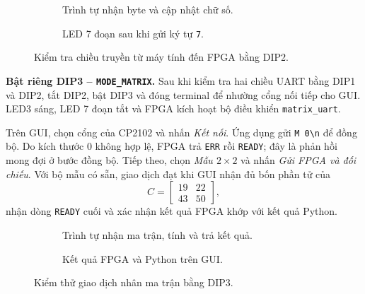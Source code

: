 \begin{figure}[H]
    \centering
    \begin{subfigure}[b]{0.47\linewidth}
        \centering
        \caption{Trình tự nhận byte và cập nhật chữ số.}
        \label{fig:mode_rx_fsm}
    \end{subfigure}
    \hfill
    \begin{subfigure}[b]{0.47\linewidth}
        \centering
        \caption{LED 7 đoạn sau khi gửi ký tự \texttt{7}.}
        \label{fig:mode_rx_evidence}
    \end{subfigure}
    \caption{Kiểm tra chiều truyền từ máy tính đến FPGA bằng DIP2.}
    \label{fig:mode_rx}
\end{figure}

\noindent\textbf{Bật riêng DIP3 -- \texttt{MODE\_MATRIX}.}
Sau khi kiểm tra hai chiều UART bằng DIP1 và DIP2, tắt DIP2,
bật DIP3 và đóng terminal để nhường cổng nối tiếp cho GUI.
LED3 sáng, LED 7 đoạn tắt và FPGA kích hoạt bộ điều khiển
\texttt{matrix\_uart}.

Trên GUI, chọn cổng của CP2102 và nhấn \textit{Kết nối}.
Ứng dụng gửi \verb|M 0\n| để đồng bộ. Do kích thước 0 không
hợp lệ, FPGA trả \texttt{ERR} rồi \texttt{READY}; đây là phản hồi
mong đợi ở bước đồng bộ. Tiếp theo, chọn \textit{Mẫu $2\times2$}
và nhấn \textit{Gửi FPGA và đối chiếu}. Với bộ mẫu có sẵn,
giao dịch đạt khi GUI nhận đủ bốn phần tử của
\[
    C =
    \begin{bmatrix}
        19 & 22\\
        43 & 50
    \end{bmatrix},
\]
nhận dòng \texttt{READY} cuối và xác nhận kết quả FPGA khớp
với kết quả Python.

\begin{figure}[H]
    \centering
    \begin{subfigure}[b]{0.47\linewidth}
        \centering
        \caption{Trình tự nhận ma trận, tính và trả kết quả.}
        \label{fig:mode_matrix_fsm}
    \end{subfigure}
    \hfill
    \begin{subfigure}[b]{0.47\linewidth}
        \centering
        \caption{Kết quả FPGA và Python trên GUI.}
        \label{fig:mode_matrix_evidence}
    \end{subfigure}
    \caption{Kiểm thử giao dịch nhân ma trận bằng DIP3.}
    \label{fig:mode_matrix}
\end{figure}

